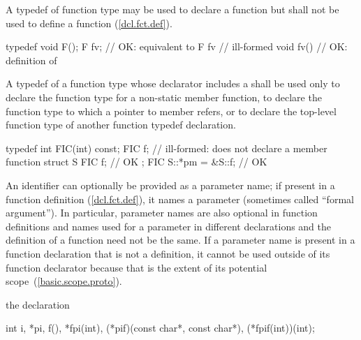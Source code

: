 \pnum
{}%
A typedef of function type may be used to declare a function but shall not be
used to define a function (\ref{dcl.fct.def}).
\enterexample

\begin{codeblock}
typedef void F();
F  fv;              // OK: equivalent to 
F  fv { }           // ill-formed
void fv() { }       // OK: definition of 
\end{codeblock}
\exitexample
A typedef of a function type whose declarator includes a
shall be used only to declare the function type for a non-static member function,
to declare the function type to which a pointer to member refers,
or to declare the top-level function type of another function typedef
declaration.
\enterexample

\begin{codeblock}
typedef int FIC(int) const;
FIC f;              // ill-formed: does not declare a member function
struct S {
  FIC f;            // OK
};
FIC S::*pm = &S::f; // OK
\end{codeblock}
\exitexample

\pnum
An identifier can optionally be provided as a parameter name;
if present in a function definition (\ref{dcl.fct.def}), it names a parameter (sometimes called ``formal argument'').
\enternote
In particular, parameter names are also optional in function definitions
and names used for a parameter in different declarations and the definition
of a function need not be the same.
If a parameter name is present in a function declaration that is not a definition,
it cannot be used outside of
its function declarator because that is the extent of its potential scope~(\ref{basic.scope.proto}).
\exitnote

\pnum
\enterexample
the declaration

%
\begin{codeblock}
int i,
    *pi,
    f(),
    *fpi(int),
    (*pif)(const char*, const char*),
    (*fpif(int))(int);
\end{codeblock}

